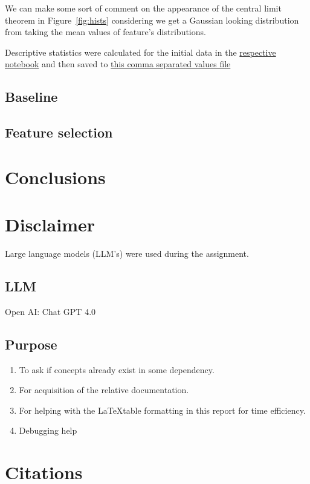 \documentclass[12pt, a4paper]{article}
\begin{document}
\begin{multicols}{2}

    We can make some sort of comment on the appearance of the central limit theorem in Figure~\ref{fig:hists} considering we get a Gaussian looking distribution \cite{} from taking the mean values of feature's distributions.
    \newline

    Descriptive statistics were calculated for the initial data in the \href{}{respective notebook} and then saved to \href{}{this comma separated values file}
    \newline

    \subsection{Baseline} \label{subsec:baseline}

    \subsection{Feature selection} \label{subsec:fs}

    \section{Conclusions} \label{sec:conc}

    \section{Disclaimer} \label{sec:disc}

    Large language models (LLM's) were used during the assignment.

    \subsection{LLM} \label{subsec:llms}

    Open AI: Chat GPT 4.0 \cite{noauthor_chatgpt_nodate}

    \subsection{Purpose} \label{subsec:llmUse}

    \begin{enumerate} \label{enm:llm}
        \item To ask if concepts already exist in some dependency.
        \item For acquisition of the relative documentation.
        \item For helping with the \LaTeX table formatting in this report for time efficiency.
        \item Debugging help
    \end{enumerate}

    \section{Citations} \label{sec:citations}

    \printbibliography

\end{multicols}
\end{document}
